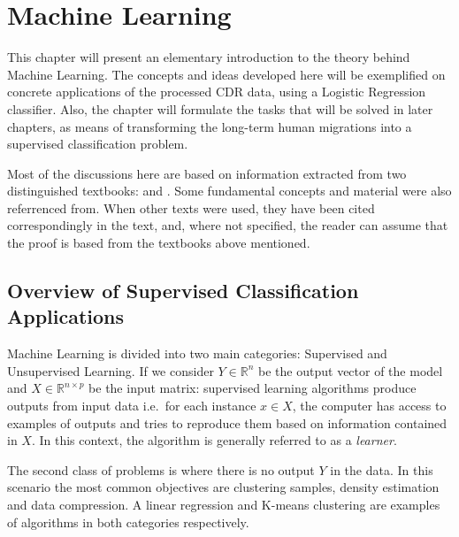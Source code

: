 

\chapter{Machine Learning}\label{ch:machineLearning}

This chapter will present an elementary introduction to the theory behind Machine Learning.
The concepts and ideas developed here will be exemplified on concrete applications of the processed CDR data, using a Logistic Regression classifier.
Also, the chapter will formulate the tasks that will be solved in later chapters, as means of transforming the long-term human migrations into a supervised classification problem.

Most of the discussions here are based on information extracted from two distinguished textbooks: \citep{bishop-patternRecognition} and \citep{hastie-elemstatslearn}.
Some fundamental concepts and material were also referrenced from\citep{scikit-learn}.
When other texts were used, they have been cited correspondingly in the text, and, where not specified, the reader can assume that the proof is based from the textbooks above mentioned.

\section{Overview of Supervised Classification Applications}\label{section-supervised-learning}


Machine Learning is divided into two main categories: Supervised and Unsupervised Learning.
If we consider $Y \in \mathbb{R}^n$ be the output vector of the model and $X \in \mathbb{R}^{n \times p}$ be the input matrix: supervised learning algorithms produce outputs from input data i.e.\ for each instance $x \in X$, the computer has access to examples of outputs and tries to reproduce them based on information contained in $X$.
In this context, the algorithm is generally referred to as a \textit{learner}.

The second class of problems is where there is no output $Y$ in the data.
In this scenario the most common objectives are clustering samples, density estimation and data compression.
A linear regression and K-means clustering are examples of algorithms in both categories respectively.

